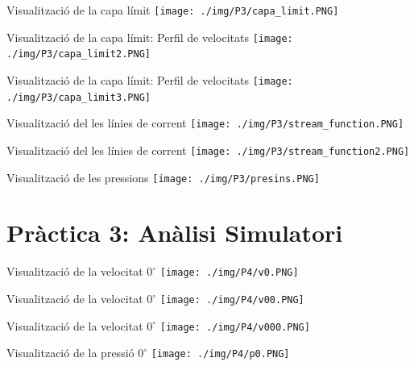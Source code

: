 \documentclass[10pt]{beamer}
\begin{document}
  \begin{frame}{Visualització de la capa límit}
    \centering
    \texttt{[image: ./img/P3/capa\_limit.PNG]}
  \end{frame}
  \begin{frame}{Visualització de la capa límit: Perfil de velocitats}
    \centering
    \texttt{[image: ./img/P3/capa\_limit2.PNG]}
  \end{frame}
  \begin{frame}{Visualització de la capa límit: Perfil de velocitats}
    \centering
    \texttt{[image: ./img/P3/capa\_limit3.PNG]}
  \end{frame}
  \begin{frame}{Visualització del les línies de corrent}
    \centering
    \texttt{[image: ./img/P3/stream\_function.PNG]}
  \end{frame}
  \begin{frame}{Visualització del les línies de corrent}
    \centering
    \texttt{[image: ./img/P3/stream\_function2.PNG]}
  \end{frame}
  \begin{frame}{Visualització de les pressions}
    \centering
    \texttt{[image: ./img/P3/presins.PNG]}
  \end{frame}








  \begingroup
  \section{Pràctica 3: Anàlisi Simulatori}
  \endgroup

  \begin{frame}{Visualització de la velocitat $0^{\circ}$}
    \centering
    \texttt{[image: ./img/P4/v0.PNG]}
  \end{frame}
  \begin{frame}{Visualització de la velocitat $0^{\circ}$}
    \centering
    \texttt{[image: ./img/P4/v00.PNG]}
  \end{frame}
  \begin{frame}{Visualització de la velocitat $0^{\circ}$}
    \centering
    \texttt{[image: ./img/P4/v000.PNG]}
  \end{frame}
  \begin{frame}{Visualització de la pressió $0^{\circ}$}
    \centering
    \texttt{[image: ./img/P4/p0.PNG]}
  \end{frame}
\end{document}

